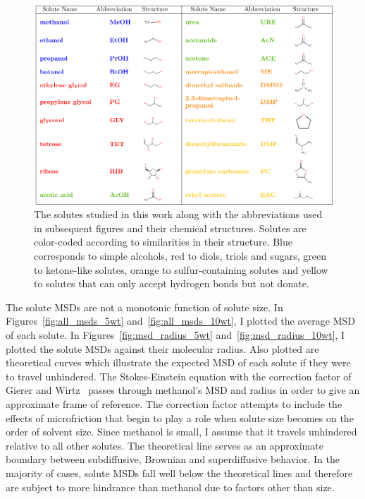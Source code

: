 \documentclass{article}
\begin{document}
  \begin{figure}
  \includegraphics[width=\textwidth]{solute_table.pdf}
  \caption{The solutes studied in this work along with the abbreviations used
  in subsequent figures and their chemical structures. Solutes are color-coded
  according to similarities in their structure. Blue corresponds to simple 
  alcohols, red to diols, triols and sugars, green to ketone-like solutes, 
  orange to sulfur-containing solutes and yellow to solutes that can only accept
  hydrogen bonds but not donate.}\label{fig:solute_table}
  \vspace{-0.5cm}
  \end{figure}
  
  The solute MSDs are not a monotonic function of solute size. In 
  Figures~\ref{fig:all_msds_5wt} and~\ref{fig:all_msds_10wt}, I plotted
  the average MSD of each solute. In Figures~\ref{fig:msd_radius_5wt} 
  and~\ref{fig:msd_radius_10wt}, I plotted the solute MSDs against their
  molecular radius. Also plotted are theoretical curves which illustrate the 
  expected MSD of each solute if they were to travel unhindered. The 
  Stokes-Einstein equation with the correction factor of Gierer and 
  Wirtz~\cite{gierer_molekulare_1953} passes through methanol's MSD and
  radius in order to give an approximate frame of reference. The correction 
  factor attempts to include the effects of microfriction that begin to 
  play a role when solute size becomes on the order of solvent size. 
  Since methanol is small, I assume that it travels unhindered relative 
  to all other solutes. The theoretical line serves as an approximate 
  boundary between subdiffusive, Brownian and superdiffusive behavior.
  In the majority of cases, solute MSDs fall well below the theoretical
  lines and therefore are subject to more hindrance than methanol due to
  factors other than size.
\end{document}
